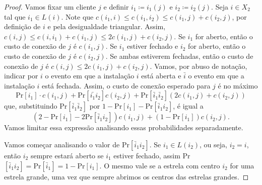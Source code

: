\begin{proof}
    Vamos fixar um cliente $j$ e definir $i_1 \coloneqq i_1(j)$ e $i_2 \coloneqq i_2(j)$. Seja $i \in X_2$ tal que $i_1 \in L(i)$. Note que $c(i_1,i) \leq c(i_1,i_2) \leq c(i_1,j) + c(i_2,j)$, por definição de $i$ e pela desigualdade triangular. Assim, $c(i,j) \leq c(i,i_1) + c(i_1,j)\leq 2 c(i_1,j) + c(i_2,j)$. Se $i_1$ for aberto, então o custo de conexão de $j$ é $c(i_1,j)$. Se $i_1$ estiver fechado e $i_2$ for aberto, então o custo de conexão de $j$ é $c(i_2,j)$. Se ambas estiverem fechadas, então o custo de conexão de $j$ é $c(i,j) \leq 2c(i_1,j) + c(i_2,j)$. Vamos, por abuso de notação, indicar por $i$ o evento em que a instalação $i$ está aberta e $\bar{i}$ o evento em que a instalação $i$ está fechada. Assim, o custo de conexão esperado para $j$ é no máximo
    \[ \text{Pr}[i_1]\cdot c(i_1,j) + \text{Pr}[\bar{i_1}i_2] c(i_2,j) + \text{Pr}[\bar{i}_1\bar{i}_2] (2c(i_1,j) + c(i_2,j))\] 
    que, substituindo Pr$[\bar{i}_1\bar{i}_2]$ por $1 - \text{Pr}[i_1] - \text{Pr}[\bar{i}_1i_2]$, é igual a
    \begin{equation}
        (2 - \text{Pr}[i_1] - 2 \text{Pr}[\bar{i}_1i_2]) c(i_1,j) + (1 - \text{Pr}[i_1])c(i_2,j). \label{pseudo:4}
    \end{equation}
    Vamos limitar essa expressão analisando essas probabilidades separadamente.

    Vamos começar analisando o valor de Pr$[\bar{i}_1i_2]$. Se $i_1 \in L(i_2)$, ou seja, $i_2 = i$, então $i_2$ sempre estará aberto se $i_1$ estiver fechado, assim Pr$[\bar{i}_1i_2] = \text{Pr}[\bar{i}_1] = 1 - \text{Pr}[i_1]$. O mesmo vale se a estrela com centro $i_2$ for uma estrela grande, uma vez que sempre abrimos os centros das estrelas grandes.


\end{proof}
